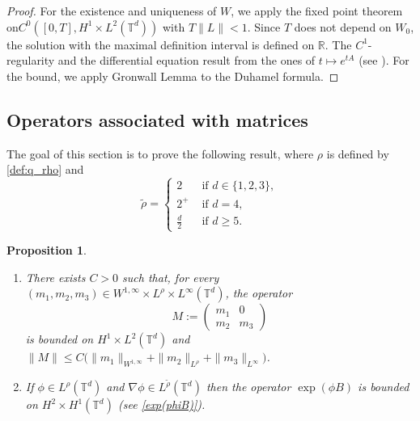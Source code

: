 \documentclass[a4paper]{article}
\theoremstyle{plain}
\newtheorem{proposition}[theorem]{Proposition}
\newcommand{\T}{\mathbb{T}}
\newcommand{\R}{\mathbb{R}}
\begin{document}
\begin{proof}
For the existence and uniqueness of $W$, we apply the fixed point theorem on\newline$C^0([0,T],H^1 \times L^2(\T^d))$ with $T \|L\|<1$. Since $T$ does not depend on $W_0$, the solution with the maximal definition interval is defined on $\R$. The $C^1$-regularity and the differential equation result from the ones of $t \mapsto e^{tA}$ (see ). For the bound, we apply Gronwall Lemma to the Duhamel formula. 
\end{proof}

\subsection{Operators associated with matrices}

The goal of this section is to prove the following result, where  $\rho$ is defined by \eqref{def:q_rho} and
\begin{equation} \label{def:rho_tild}
\widetilde{\rho} = \left\lbrace \begin{array}{ll}
2 & \text{ if } d \in \{1,2,3\}, \\
2^+ & \text{ if } d=4, \\
\frac{d}{2} & \text{ if } d \geq 5.
\end{array}\right.
\end{equation}

\begin{proposition} \label{Lem:M}
\begin{enumerate}[topsep=0cm, parsep=0cm, itemsep=0cm]
\item There exists $C>0$ such that, for every
$(m_1,m_2,m_3) \in  W^{1,\infty} \times L^{\rho} \times L^{\infty}(\mathbb{T}^d)$, the operator
\begin{equation} \label{def:M}
M:=\begin{pmatrix}
 m_{1} & 0 \\
 m_{2} & m_{3}
 \end{pmatrix}
\end{equation}
is bounded on $H^1 \times L^2(\T^d)$ and 
$\|M\| \leq C \big( \|m_1\|_{W^{1,\infty}}+\|m_{2}\|_{L^{\rho}}+\|m_{3}\|_{L^{\infty}} \big)$.
%
\item If $\phi \in L^{\rho}(\T^d)$ and $\nabla \phi \in L^{\widetilde{\rho}}(\T^d)$ then the operator
$\exp(\phi B)$ is bounded on $H^2 \times H^1(\T^d)$ (see \eqref{exp(phiB)}).
\end{enumerate}
\end{proposition} 
\end{document}

